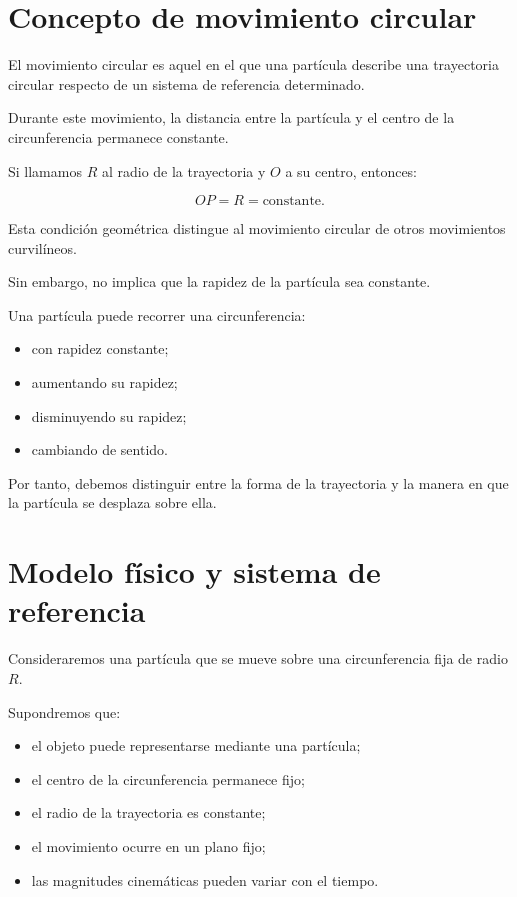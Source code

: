 \section{Concepto de movimiento circular}

\begin{definicion}

El movimiento circular es aquel en el que una partícula describe una
trayectoria circular respecto de un sistema de referencia determinado.

Durante este movimiento, la distancia entre la partícula y el centro de la
circunferencia permanece constante.

\end{definicion}

Si llamamos \(R\) al radio de la trayectoria y \(O\) a su centro, entonces:

\[
OP=R=\text{constante}.
\]

Esta condición geométrica distingue al movimiento circular de otros
movimientos curvilíneos.

Sin embargo, no implica que la rapidez de la partícula sea constante.

Una partícula puede recorrer una circunferencia:

\begin{itemize}
    \item con rapidez constante;
    \item aumentando su rapidez;
    \item disminuyendo su rapidez;
    \item cambiando de sentido.
\end{itemize}

Por tanto, debemos distinguir entre la forma de la trayectoria y la manera en
que la partícula se desplaza sobre ella.


\section{Modelo físico y sistema de referencia}

Consideraremos una partícula que se mueve sobre una circunferencia fija de
radio \(R\).

\begin{modelo}

Supondremos que:

\begin{itemize}
    \item el objeto puede representarse mediante una partícula;
    \item el centro de la circunferencia permanece fijo;
    \item el radio de la trayectoria es constante;
    \item el movimiento ocurre en un plano fijo;
    \item las magnitudes cinemáticas pueden variar con el tiempo.
\end{itemize}

\end{modelo}

